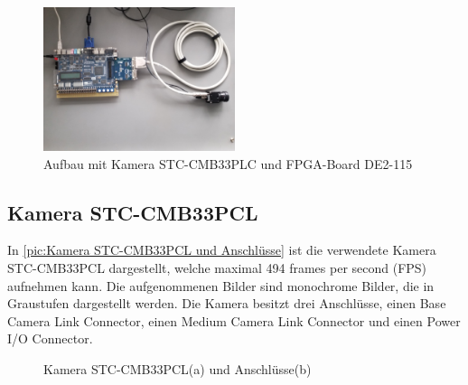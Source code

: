 \documentclass[ngerman,12pt]{article} %
\begin{document}
{\begin{figure} [h!tb]
	\begin{center}
	\includegraphics[width=0.5\textwidth]{Gesamter_Aufbau_1_20190930_135046}
	\caption[Aufbau mit Kamera STC-CMB33PLC und FPGA-Board DE2-115]{\label{pic:Aufbau}Aufbau mit Kamera STC-CMB33PLC und FPGA-Board DE2-115}
	\end{center}
\end{figure}



\subsection{Kamera STC-CMB33PCL}
\label{sec:Kamera STC-CMB33PCL}
In \autoref{pic:Kamera STC-CMB33PCL und Anschlüsse} ist die verwendete Kamera STC-CMB33PCL dargestellt, welche maximal 494 frames per second (FPS) aufnehmen kann. Die aufgenommenen Bilder sind monochrome Bilder, die in Graustufen dargestellt werden. Die Kamera besitzt drei Anschlüsse, einen Base Camera Link Connector, einen Medium Camera Link Connector und einen Power I/O Connector.\newline

\begin{figure}[h!tb]
  \centering
  \qquad
  \caption[Kamera STC-CMB33PCL und Anschlüsse]{\label{pic:Kamera STC-CMB33PCL und Anschlüsse}Kamera STC-CMB33PCL(a) und Anschlüsse(b)}
\end{figure}

}
\end{document}
